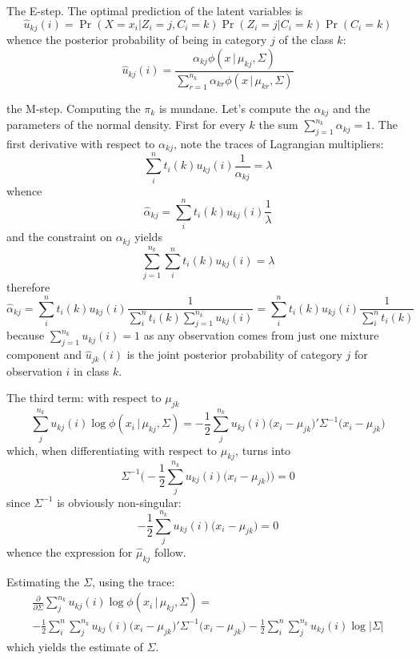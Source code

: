 \documentclass[a4paper]{article}
\begin{document}
The E-step. The optimal prediction of the latent variables is
\[\hat{u}_{kj}(i) = \Pr(X=x_i\lvert Z_i=j, C_i = k) \Pr(Z_i=j\lvert C_i = k) \Pr(C_i = k)\]
whence the posterior probability of being in category $j$ of the class $k$:
\[\hat{u}_{kj}(i) = \frac{\alpha_{kj} \phi(x\,\lvert\,\mu_{kj}, \Sigma)}{\sum_{r=1}^{n_k} \alpha_{kr} \phi(x\,\lvert\,\mu_{kr}, \Sigma) }\]

the M-step. Computing the $\pi_k$ is mundane. Let's compute the $\alpha_{kj}$ and the parameters of the normal density.
First for every $k$ the sum $\sum_{j=1}^{n_k}\alpha_{kj} = 1$. The first derivative with respect to $\alpha_{kj}$, note the traces of Lagrangian multipliers:
\[ \sum_i^n t_i(k) u_{kj}(i) \frac{1}{\alpha_{kj}} = \lambda\]
whence 
\[\hat{\alpha}_{kj} = \sum_i^n t_i(k) u_{kj}(i) \frac{1}{\lambda} \]
and the constraint on $\alpha_{kj}$ yields
\[\sum_{j=1}^{n_k} \sum_i^n t_i(k) u_{kj}(i) = \lambda \]
therefore
\[\hat{\alpha}_{kj}
= \sum_i^n t_i(k) u_{kj}(i) \frac{1}{\sum_i^n t_i(k) \sum_{j=1}^{n_k} u_{kj}(i)}
= \sum_i^n t_i(k) u_{kj}(i) \frac{1}{ \sum_i^n t_i(k) } \]
because $\sum_{j=1}^{n_k} u_{kj}(i) = 1$ as any observation comes from just one mixture component
and $\hat{u}_{jk}(i)$ is the joint posterior probability of category $j$ for observation $i$ in class $k$.

The third term: with respect to $\mu_{jk}$
\[\sum_j^{n_k} u_{kj}(i) \log \phi(x_i\,\lvert\,\mu_{kj}, \Sigma)
= - \frac{1}{2} \sum_j^{n_k} u_{kj}(i) \big(x_i - \mu_{jk}\big)'\Sigma^{-1}\big(x_i - \mu_{jk}\big)\]
which, when differentiating with respect to $\mu_{kj}$, turns into
\[ \Sigma^{-1}\Big( - \frac{1}{2} \sum_j^{n_k} u_{kj}(i) \big(x_i - \mu_{jk}\big) \Big) = 0\]
since $\Sigma^{-1}$ is obviously non-singular:
\[ - \frac{1}{2} \sum_j^{n_k} u_{kj}(i) \big(x_i - \mu_{jk}\big) = 0\]
whence the expression for $\hat{\mu}_{kj}$ follow.

Estimating the $\Sigma$, using the trace:
\begin{multline*}
\frac{\partial }{\partial \Sigma} \sum_j^{n_k} u_{kj}(i) \log \phi(x_i\,\lvert\,\mu_{kj}, \Sigma) = \\
	- \frac{1}{2} \sum_i^n \sum_j^{n_k} u_{kj}(i) \big(x_i - \mu_{jk}\big)'\Sigma^{-1}\big(x_i - \mu_{jk}\big)
	- \frac{1}{2} \sum_i^n \sum_j^{n_k} u_{kj}(i) \log \lvert \Sigma\rvert
\end{multline*}
which yields the estimate of $\Sigma$.


\end{document}
